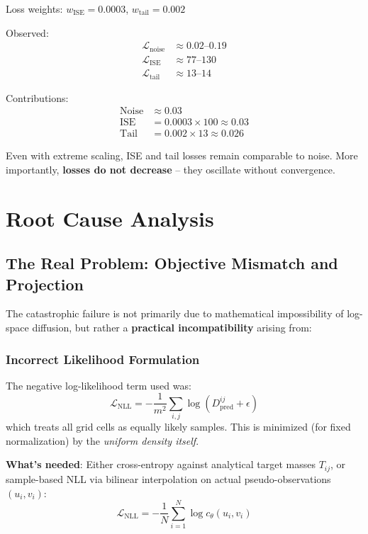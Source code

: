 \documentclass[11pt]{article}
\begin{document}
Loss weights: $w_{\text{ISE}} = 0.0003$, $w_{\text{tail}} = 0.002$

Observed:
\begin{align}
\mathcal{L}_{\text{noise}} &\approx 0.02\text{--}0.19 \\
\mathcal{L}_{\text{ISE}} &\approx 77\text{--}130 \\
\mathcal{L}_{\text{tail}} &\approx 13\text{--}14
\end{align}

Contributions:
\begin{align}
\text{Noise} &\approx 0.03 \\
\text{ISE} &= 0.0003 \times 100 \approx 0.03 \\
\text{Tail} &= 0.002 \times 13 \approx 0.026
\end{align}

Even with extreme scaling, ISE and tail losses remain comparable to noise. More importantly, \textbf{losses do not decrease} -- they oscillate without convergence.

\section{Root Cause Analysis}

\subsection{The Real Problem: Objective Mismatch and Projection}

The catastrophic failure is not primarily due to mathematical impossibility of log-space diffusion, but rather a \textbf{practical incompatibility} arising from:

\subsubsection{Incorrect Likelihood Formulation}

The negative log-likelihood term used was:
\begin{equation}
\mathcal{L}_{\text{NLL}} = -\frac{1}{m^2} \sum_{i,j} \log(D_{\text{pred}}^{ij} + \epsilon)
\end{equation}
which treats all grid cells as equally likely samples. This is minimized (for fixed normalization) by the \emph{uniform density itself}. 

\textbf{What's needed}: Either cross-entropy against analytical target masses $T_{ij}$, or sample-based NLL via bilinear interpolation on actual pseudo-observations $(u_i, v_i)$:
\begin{equation}
\mathcal{L}_{\text{NLL}} = -\frac{1}{N} \sum_{i=1}^N \log c_\theta(u_i, v_i)
\end{equation}
\end{document}
